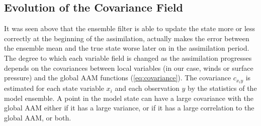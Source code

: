 \subsection{Evolution of the  Covariance Field}

It was seen above that the ensemble filter is able to update the state more or less correctly at the beginning of the assimilation, actually makes the error between the ensemble mean and the true state worse later on in the assimilation period.
The degree to which each variable field is changed as the assimilation progresses depends on the covariances between local variables (in our case, winds or surface pressure) and the global AAM functions (\ref{eq:covariance}).
The covariance $c_{x_iy}$ is estimated for each state variable $x_i$ and each observation $y$ by the statistics of the model ensemble.  
A point in the model state can have a large covariance with the global AAM either if it has a large variance, or if it has a large correlation to the global AAM, or both.

